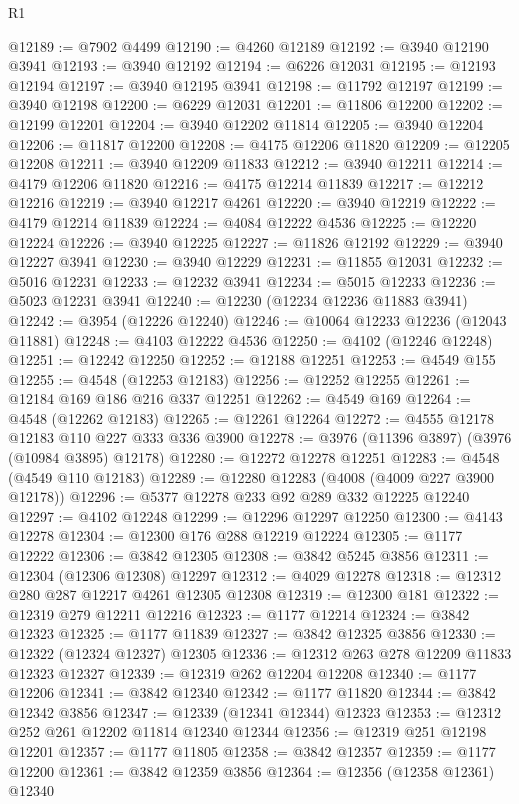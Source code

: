 \begin{lexlean}{R1}
\begin{coremodule}
@12189 := @7902 @4499
@12190 := @4260 @12189
@12192 := @3940 @12190 @3941
@12193 := @3940 @12192
@12194 := @6226 @12031
@12195 := @12193 @12194
@12197 := @3940 @12195 @3941
@12198 := @11792 @12197
@12199 := @3940 @12198
@12200 := @6229 @12031
@12201 := @11806 @12200
@12202 := @12199 @12201
@12204 := @3940 @12202 @11814
@12205 := @3940 @12204
@12206 := @11817 @12200
@12208 := @4175 @12206 @11820
@12209 := @12205 @12208
@12211 := @3940 @12209 @11833
@12212 := @3940 @12211
@12214 := @4179 @12206 @11820
@12216 := @4175 @12214 @11839
@12217 := @12212 @12216
@12219 := @3940 @12217 @4261
@12220 := @3940 @12219
@12222 := @4179 @12214 @11839
@12224 := @4084 @12222 @4536
@12225 := @12220 @12224
@12226 := @3940 @12225
@12227 := @11826 @12192
@12229 := @3940 @12227 @3941
@12230 := @3940 @12229
@12231 := @11855 @12031
@12232 := @5016 @12231
@12233 := @12232 @3941
@12234 := @5015 @12233
@12236 := @5023 @12231 @3941
@12240 := @12230 (@12234 @12236 @11883 @3941)
@12242 := @3954 (@12226 @12240)
@12246 := @10064 @12233 @12236 (@12043 @11881)
@12248 := @4103 @12222 @4536
@12250 := @4102 (@12246 @12248)
@12251 := @12242 @12250
@12252 := @12188 @12251
@12253 := @4549 @155
@12255 := @4548 (@12253 @12183)
@12256 := @12252 @12255
@12261 := @12184 @169 @186 @216 @337 @12251
@12262 := @4549 @169
@12264 := @4548 (@12262 @12183)
@12265 := @12261 @12264
@12272 := @4555 @12178 @12183 @110 @227 @333 @336 @3900
@12278 := @3976 (@11396 @3897) (@3976 (@10984 @3895) @12178)
@12280 := @12272 @12278 @12251
@12283 := @4548 (@4549 @110 @12183)
@12289 := @12280 @12283 (@4008 (@4009 @227 @3900 @12178))
@12296 := @5377 @12278 @233 @92 @289 @332 @12225 @12240
@12297 := @4102 @12248
@12299 := @12296 @12297 @12250
@12300 := @4143 @12278
@12304 := @12300 @176 @288 @12219 @12224
@12305 := @1177 @12222
@12306 := @3842 @12305
@12308 := @3842 @5245 @3856
@12311 := @12304 (@12306 @12308) @12297
@12312 := @4029 @12278
@12318 := @12312 @280 @287 @12217 @4261 @12305 @12308
@12319 := @12300 @181
@12322 := @12319 @279 @12211 @12216
@12323 := @1177 @12214
@12324 := @3842 @12323
@12325 := @1177 @11839
@12327 := @3842 @12325 @3856
@12330 := @12322 (@12324 @12327) @12305
@12336 := @12312 @263 @278 @12209 @11833 @12323 @12327
@12339 := @12319 @262 @12204 @12208
@12340 := @1177 @12206
@12341 := @3842 @12340
@12342 := @1177 @11820
@12344 := @3842 @12342 @3856
@12347 := @12339 (@12341 @12344) @12323
@12353 := @12312 @252 @261 @12202 @11814 @12340 @12344
@12356 := @12319 @251 @12198 @12201
@12357 := @1177 @11805
@12358 := @3842 @12357
@12359 := @1177 @12200
@12361 := @3842 @12359 @3856
@12364 := @12356 (@12358 @12361) @12340

\end{coremodule}
\end{lexlean}
